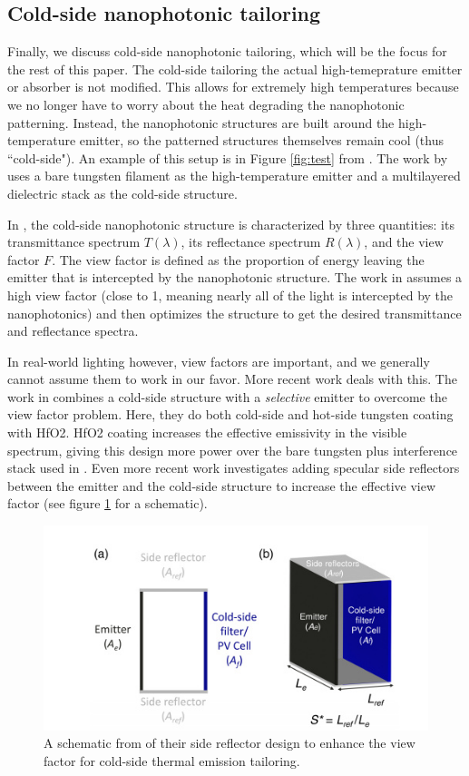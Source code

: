 \documentclass[%
 reprint,
 amsmath,amssymb,
 aps
]{revtex4-2}
\begin{document}
\subsection{Cold-side nanophotonic tailoring}
Finally, we discuss cold-side nanophotonic tailoring, which will be the focus for the rest of this paper. The cold-side tailoring the actual high-temeprature emitter or absorber is not modified. This allows for extremely high temperatures because we no longer have to worry about the heat degrading the nanophotonic patterning. Instead, the nanophotonic structures are built around the high-temperature emitter, so the patterned structures themselves remain cool (thus ``cold-side"). An example of this setup is in Figure \ref{fig:test} from \cite{ilic}. The work by \cite{ilic} uses a bare tungsten filament as the high-temperature emitter and a multilayered dielectric stack as the cold-side structure. 

In \cite{ilic}, the cold-side nanophotonic structure is characterized by three quantities: its transmittance spectrum $T(\lambda)$, its reflectance spectrum $R(\lambda)$, and the view factor $F$. The view factor is defined as the proportion of energy leaving the emitter that is intercepted by the nanophotonic structure. The work in \cite{ilic} assumes a high view factor (close to 1, meaning nearly all of the light is intercepted by the nanophotonics) and then optimizes the structure to get the desired transmittance and reflectance spectra.

In real-world lighting however, view factors are important, and we generally cannot assume them to work in our favor. More recent work deals with this. The work in \cite{view_factor_1} combines a cold-side structure with a {\it selective} emitter to overcome the view factor problem. Here, they do both cold-side and hot-side tungsten coating with HfO2. HfO2 coating increases the effective emissivity in the visible spectrum, giving this design more power over the bare tungsten plus interference stack used in \cite{ilic}. Even more recent work investigates adding specular side reflectors between the emitter and the cold-side structure to increase the effective view factor \cite{view_factor_2} (see figure \ref{side_refl} for a schematic).

\begin{figure}
    \centering
    \includegraphics[width=.7\linewidth]{cold_side_specular.jpeg}
    \caption{A schematic from \cite{view_factor_2} of their side reflector design to enhance the view factor for cold-side thermal emission tailoring.}
    \label{side_refl}
\end{figure}
\end{document}
